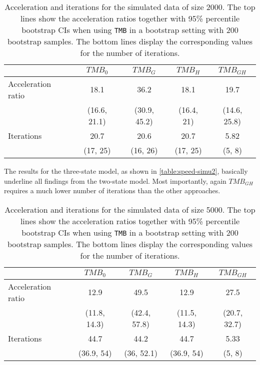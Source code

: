 \documentclass[bimj,fleqn]{w-art}\usepackage[]{graphicx}\usepackage[]{color}
\theoremstyle{plain}
\theoremstyle{definition}
\begin{document}
\begin{table}[ht]
\centering
\begin{tabular}{lcccc}
  \hline
 & \textit{${TMB_0}$} & \textit{${TMB_G}$} & \textit{${TMB_H}$} & \textit{${TMB_{GH}}$} \\ 
  \hline
Acceleration ratio & 18.1 & 36.2 & 18.1 & 19.7 \\ 
   &  (16.6, 21.1)  &  (30.9, 45.2)  &  (16.4, 21)  &  (14.6, 25.8)  \\ 
  Iterations & 20.7 & 20.6 & 20.7 & 5.82 \\ 
   &  (17, 25)  &  (16, 26)  &  (17, 25)  &  (5, 8)  \\ 
   \hline
\end{tabular}
\caption{Acceleration and iterations for the simulated data of size 2000. The top lines show the acceleration ratios together with 95\% percentile bootstrap CIs when using {\tt TMB} in a bootstrap setting with 200 bootstrap samples. The bottom lines display the corresponding values for the number of iterations.} 
\label{table:speed-simu1}
\end{table}


The results for the three-state model, as shown in \autoref{table:speed-simu2}, basically underline all findings from the two-state model. Most importantly, again $TMB_{GH}$ requires a much lower number of iterations than the other approaches. 

\begin{table}[ht]
\centering
\begin{tabular}{lcccc}
  \hline
 & \textit{${TMB_0}$} & \textit{${TMB_G}$} & \textit{${TMB_H}$} & \textit{${TMB_{GH}}$} \\ 
  \hline
Acceleration ratio & 12.9 & 49.5 & 12.9 & 27.5 \\ 
   &  (11.8, 14.3)  &  (42.4, 57.8)  &  (11.5, 14.3)  &  (20.7, 32.7)  \\ 
  Iterations & 44.7 & 44.2 & 44.7 & 5.33 \\ 
   &  (36.9, 54)  &  (36, 52.1)  &  (36.9, 54)  &  (5, 8)  \\ 
   \hline
\end{tabular}
\caption{Acceleration and iterations for the simulated data of size 5000. The top lines show the acceleration ratios together with 95\% percentile bootstrap CIs when using {\tt TMB} in a bootstrap setting with 200 bootstrap samples. The bottom lines display the corresponding values for the number of iterations.} 
\label{table:speed-simu2}
\end{table}
\end{document}
